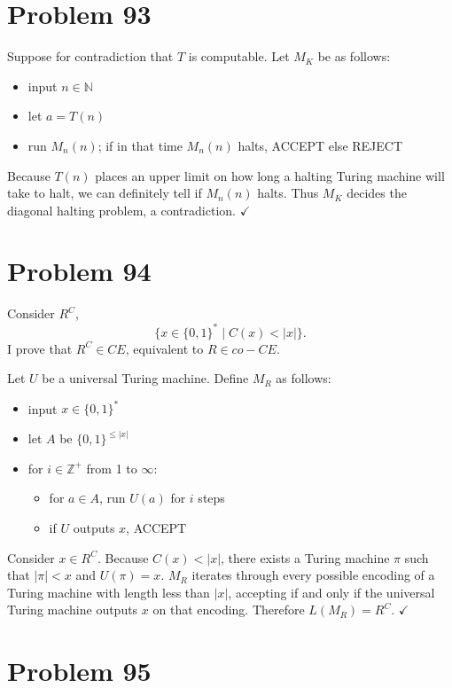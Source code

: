 \documentclass[11pt]{article}
\begin{document}
\section*{Problem 93}

Suppose for contradiction that $T$ is computable.
Let $M_K$ be as follows:
\begin{itemize}
	\item input $n \in \mathbb{N}$
	\item let $a = T(n)$
	\item run $M_n(n)$; if in that time $M_n(n)$ halts, ACCEPT else REJECT
\end{itemize}

Because $T(n)$ places an upper limit on how long a halting Turing machine will take to halt, we can definitely tell if $M_n(n)$ halts.
Thus $M_K$ decides the diagonal halting problem, a contradiction. $\checkmark$


\section*{Problem 94}

Consider $R^C$,
	\[ \{x \in \{0,1\}^* \mid C(x) < |x| \}. \]
I prove that $R^C \in CE$, equivalent to $R \in co-CE$.

Let $U$ be a universal Turing machine.
Define $M_R$ as follows:
\begin{itemize}
	\item input $x \in \{0,1\}^* $
	\item let $A$ be $\{0,1\}^{\leq |x|}$
	\item for $i \in \mathbb{Z}^+$ from 1 to $\infty$:
	\begin{itemize}
		\item for $a \in A$, run $U(a)$ for $i$ steps
		\item if $U$ outputs $x$, ACCEPT
	\end{itemize}
\end{itemize}

Consider $x \in R^C$.
Because $C(x) < |x|$, there exists a Turing machine $\pi$ such that $|\pi| < x$ and $U(\pi) = x$.
$M_R$ iterates through every possible encoding of a Turing machine with length less than $|x|$, accepting if and only if the universal Turing machine outputs $x$ on that encoding.
Therefore $L(M_R) = R^C$. $\checkmark$


\section*{Problem 95}
\end{document}
